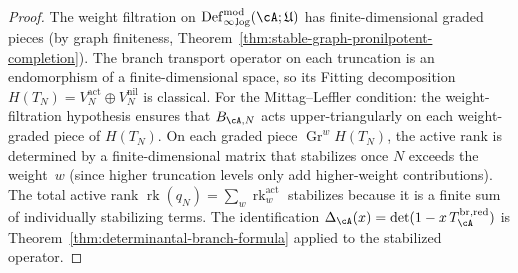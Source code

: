 \begin{proof}
The weight filtration on
$\operatorname{Def}_{\infty,\!\log}^{\mathrm{mod}}(\cA;\mathfrak{U})$ has finite-dimensional
graded pieces (by graph finiteness,
Theorem~\ref{thm:stable-graph-pronilpotent-completion}).
The branch transport operator on each truncation is an endomorphism
of a finite-dimensional space, so its Fitting decomposition
$H(T_N) = V_N^{\mathrm{act}} \oplus V_N^{\mathrm{nil}}$ is
classical.  For the Mittag--Leffler condition: the
weight-filtration hypothesis ensures that $B_{\cA,N}$ acts
upper-triangularly on each weight-graded piece of $H(T_N)$.
On each graded piece $\operatorname{Gr}^w H(T_N)$, the active
rank is determined by a finite-dimensional matrix that stabilizes
once $N$ exceeds the weight~$w$ (since higher truncation levels
only add higher-weight contributions).  The total active rank
$\operatorname{rk}(q_N) = \sum_w \operatorname{rk}^{\mathrm{act}}_w$
stabilizes because it is a finite sum of individually stabilizing terms.  The identification
$\Delta_\cA(x) = \det(1 - x\, T_\cA^{\mathrm{br,red}})$ is
Theorem~\ref{thm:determinantal-branch-formula}
applied to the stabilized operator.
\end{proof}

